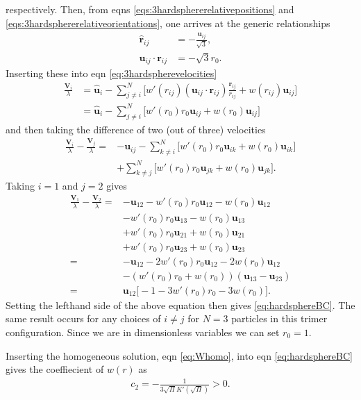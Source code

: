 \documentclass[twocolumn,amsmath,amssymb,aps]{revtex4-1}%
\begin{document}
respectively. Then, from eqns \ref{eqs:3hardsphererelativepositions}
and \ref{eqs:3hardsphererelativeorientations}, one arrives at the generic
relationships
\begin{align}
  \bm{\hat{r}}_{ij} &= -\frac{\bm{u}_{ij}}{\sqrt{3}},\\
  \bm{u}_{ij}\cdot\bm{r}_{ij} &= -\sqrt{3}r_0.
\end{align}
Inserting these into eqn \ref{eq:3hardspherevelocities}
\begin{align}
  \frac{\bm{V}_i}{\lambda}
  &=\bm{\hat{u}}_i-\sum_{j\neq i}^N \bigg[w'(r_{ij})
    (\bm{u}_{ij}\cdot\bm{r}_{ij})\frac{\bm{r}_{ij}}{r_{ij}}
    +w(r_{ij})\bm{u}_{ij}\bigg]\nonumber\\
  &=\bm{\hat{u}}_i-\sum_{j\neq i}^N \bigg[w'(r_0)
    r_0\bm{u}_{ij}+w(r_0)\bm{u}_{ij}\bigg]
\end{align}
and then taking the difference of two (out of three) velocities
\begin{align}
  \frac{\bm{V}_i}{\lambda}-\frac{\bm{V}_j}{\lambda}
  =&-\bm{u}_{ij}-\sum_{k\neq i}^N \bigg[w'(r_0)
     r_0\bm{u}_{ik}+w(r_0)\bm{u}_{ik}\bigg]\nonumber\\
   &+\sum_{k\neq j}^N \bigg[w'(r_0)
     r_0\bm{u}_{jk}+w(r_0)\bm{u}_{jk}\bigg].
\end{align}
Taking $i=1$ and $j=2$ gives
\begin{align}
  \frac{\bm{V}_1}{\lambda}-\frac{\bm{V}_2}{\lambda}
  =&-\bm{u}_{12}-w'(r_0)r_0\bm{u}_{12}-w(r_0)\bm{u}_{12}
  \nonumber\\
  &-w'(r_0)r_0\bm{u}_{13}-w(r_0)\bm{u}_{13}\nonumber\\
  &+w'(r_0)r_0\bm{u}_{21}+w(r_0)\bm{u}_{21}\nonumber\\
  &+w'(r_0)r_0\bm{u}_{23}+w(r_0)\bm{u}_{23}\nonumber\\
  =&-\bm{u}_{12}-2w'(r_0)r_0\bm{u}_{12}-2w(r_0)\bm{u}_{12}
  \nonumber\\
  &-(w'(r_0)r_0+w(r_0))(\bm{u}_{13}-\bm{u}_{23})\nonumber\\
  =&\bm{u}_{12}\big[-1-3w'(r_0)r_0-3w(r_0)\big].
\end{align}
Setting the lefthand side of the above equation then gives
\ref{eq:hardsphereBC}. The same result occurs for any choices of $i\neq j$
for $N=3$ particles in this trimer configuration. Since we are in
dimensionless variables we can set $r_0=1$.

Inserting the homogeneous solution, eqn \ref{eq:Whomo}, into eqn
\ref{eq:hardsphereBC} gives the coeffiecient of $w(r)$ as
\begin{align}
  c_2 = -\frac{1}{3\sqrt{\Pi}K'(\sqrt{\Pi})}>0.
\end{align}
     
\end{document}
